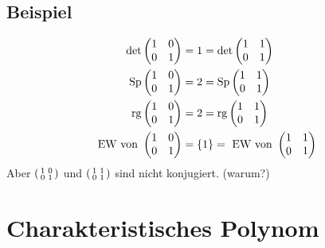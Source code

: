 \subsection[Beispiel zweier Matrizen, die alle Kriterien erfüllen, aber nicht konjugiert sind]{Beispiel} %
\label{sub:57}
\begin{align*}
	\det \begin{pmatrix}
		1 & 0 \\
		0 & 1			
	\end{pmatrix} &= 1 = \det \begin{pmatrix}
		1 & 1 \\
		0 & 1
	\end{pmatrix} \\
	\Sp \begin{pmatrix}
		1 & 0 \\
		0 & 1			
	\end{pmatrix} &= 2 = \Sp \begin{pmatrix}
		1 & 1 \\
		0 & 1
	\end{pmatrix} \\
	\rg {\begin{pmatrix}
		1 & 0 \\
		0 & 1			
	\end{pmatrix}} &= 2 = \rg {\begin{pmatrix}
		1 & 1 \\
		0 & 1
	\end{pmatrix}} \\
	\text{EW von }  \begin{pmatrix}
		1 & 0 \\
		0 & 1			
	\end{pmatrix} &= \{1\} = \text{ EW von } \begin{pmatrix}
		1 & 1 \\
		0 & 1
	\end{pmatrix}
\end{align*}
Aber $\enbrace*{\begin{smallmatrix}1  &  0\\  0 & 1  \end{smallmatrix}}$ und $\enbrace*{\begin{smallmatrix}1  & 1 \\  0 & 1  \end{smallmatrix}}$ sind nicht konjugiert. 
(warum?)
\newpage

\section{Charakteristisches Polynom} %
\label{sec:6}

